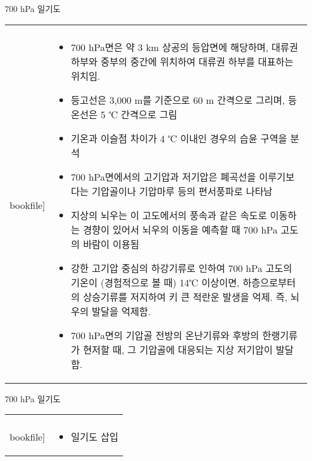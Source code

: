 \begin{frame}[t]{700 hPa 일기도}
	\begin{tabular}{ll}
		\begin{minipage}[t]{0.3\textwidth}\scriptsize
			\begin{figure}[t]
				\texttt{[image: \\bookfile]}
			\end{figure}
		\end{minipage}	
		&
		\begin{minipage}[t]{0.65\textwidth} \scriptsize	
			\begin{itemize}
				\item 700 hPa면은 약 3 km 상공의 등압면에 해당하며, 대류권 하부와 중부의 중간에 위치하여 대류권 하부를 대표하는 위치임.
				\item 등고선은 3,000 m를 기준으로 60 m 간격으로 그리며, 등온선은 5 ℃ 간격으로 그림
				\item 기온과 이슬점 차이가 4 ℃ 이내인 경우의 습윤 구역을 분석
				\item 700 hPa면에서의 고기압과 저기압은 폐곡선을 이루기보다는 기압골이나 기압마루 등의 편서풍파로 나타남
				\item 지상의 뇌우는 이 고도에서의 풍속과 같은 속도로 이동하는 경향이 있어서 뇌우의 이동을 예측할 때 700 hPa 고도의 바람이 이용됨
				\item 강한 고기압 중심의 하강기류로 인하여 700 hPa 고도의 기온이 (경험적으로 볼 때) 14℃ 이상이면, 하층으로부터의 상승기류를 저지하여 키 큰 적란운 발생을 억제. 즉, 뇌우의 발달을 억제함. 
				\item 700 hPa면의 기압골 전방의 온난기류와 후방의 한랭기류가 현저할 때, 그 기압골에 대응되는 지상 저기압이 발달함.
					
			\end{itemize}

		\end{minipage}
	\end{tabular}
\end{frame}



\begin{frame}[t]{700 hPa 일기도}
	\begin{tabular}{ll}
		\begin{minipage}[t]{0.3\textwidth}\scriptsize
			\begin{figure}[t]
				\texttt{[image: \\bookfile]}
			\end{figure}
		\end{minipage}	
		&
		\begin{minipage}[t]{0.65\textwidth} \scriptsize	
			\begin{itemize}
				\item 일기도 삽입
					
			\end{itemize}

		\end{minipage}
	\end{tabular}
\end{frame}


